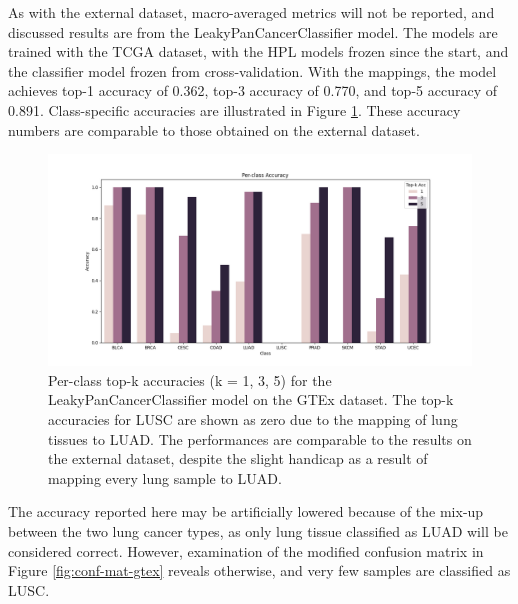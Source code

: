 \documentclass{l4proj}
\begin{document}
As with the external dataset, macro-averaged metrics will not be reported, and discussed results are from the LeakyPanCancerClassifier model. The models are trained with the TCGA dataset, with the HPL models frozen since the start, and the classifier model frozen from cross-validation. With the mappings, the model achieves top-1 accuracy of 0.362, top-3 accuracy of 0.770, and top-5 accuracy of 0.891. Class-specific accuracies are illustrated in Figure \ref{fig:class-acc-gtex}. These accuracy numbers are comparable to those obtained on the external dataset.

\begin{figure}[h]
    \centering
    \includegraphics[width=1\linewidth]{images/gtexacc.png}
    \caption{Per-class top-k accuracies (k = 1, 3, 5) for the LeakyPanCancerClassifier model on the GTEx dataset. The top-k accuracies for LUSC are shown as zero due to the mapping of lung tissues to LUAD. The performances are comparable to the results on the external dataset, despite the slight handicap as a result of mapping every lung sample to LUAD.}
    \label{fig:class-acc-gtex}
\end{figure}

The accuracy reported here may be artificially lowered because of the mix-up between the two lung cancer types, as only lung tissue classified as LUAD will be considered correct. However, examination of the modified confusion matrix in Figure \ref{fig:conf-mat-gtex} reveals otherwise, and very few samples are classified as LUSC.
\end{document}
